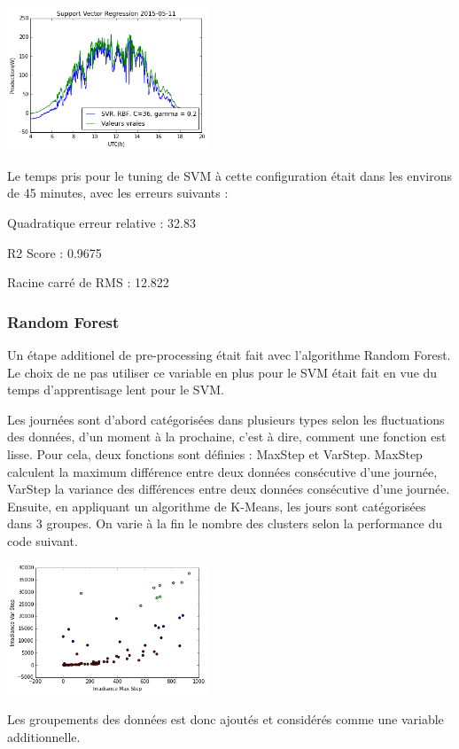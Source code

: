 \documentclass[a4paper]{article}
\begin{document}
\begin{multicols}{2}
\includegraphics[width=0.45\textwidth]{./images/11maysvm.png}

Le temps pris pour le tuning de SVM à cette configuration était dans les environs de 45 minutes, avec les erreurs suivants : 

Quadratique erreur relative : 32.83

R2 Score : 0.9675

Racine carré de RMS : 12.822

\subsubsection{Random Forest}
Un étape additionel de pre-processing était fait avec l'algorithme Random Forest. Le choix de ne pas utiliser ce variable en plus pour le SVM était fait en vue du temps d'apprentisage lent pour le SVM. 

Les journées sont d’abord catégorisées dans plusieurs types selon les fluctuations des données, d’un moment à la prochaine, c’est à dire, comment une fonction est lisse. Pour cela, deux fonctions sont définies : MaxStep et VarStep. MaxStep calculent la maximum différence entre deux données consécutive d’une journée, VarStep la variance des différences entre deux données consécutive d’une journée. Ensuite, en appliquant un algorithme de K-Means, les jours sont catégorisées dans 3 groupes. On varie à la fin le nombre des clusters selon la performance du code suivant.


\includegraphics[width=0.45\textwidth]{./images/categoriesgraph.png}


Les groupements des données est donc ajoutés et considérés comme une variable additionnelle. 





\end{multicols}
\end{document}
